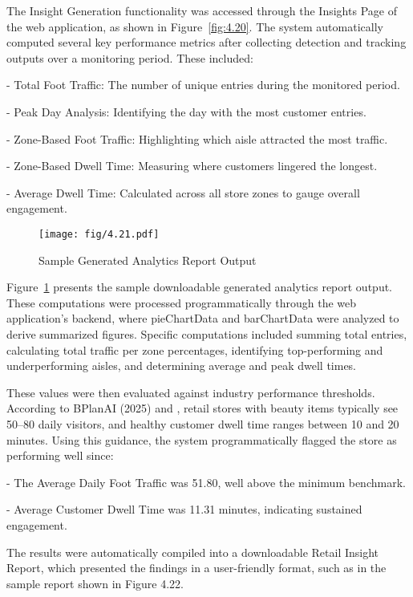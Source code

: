 {The Insight Generation functionality was accessed through the Insights Page of the web application, as shown in Figure~\ref{fig:4.20}. The system automatically computed several key performance metrics after collecting detection and tracking outputs over a monitoring period. These included:

\noindent - Total Foot Traffic: The number of unique entries during the monitored period.

\noindent - Peak Day Analysis: Identifying the day with the most customer entries.

\noindent - Zone-Based Foot Traffic: Highlighting which aisle attracted the most traffic.

\noindent - Zone-Based Dwell Time: Measuring where customers lingered the longest.

\noindent - Average Dwell Time: Calculated across all store zones to gauge overall engagement.

\begin{figure}[H]
	\caption[Sample Generated Analytics Report Output]{\newline \newline Sample Generated Analytics Report Output}
	\centering
	\texttt{[image: fig/4.21.pdf]}
	\label{fig:4.21}
\end{figure}

Figure~\ref{fig:4.21} presents the sample downloadable generated analytics report output. These computations were processed programmatically through the web application's backend, where pieChartData and barChartData were analyzed to derive summarized figures. Specific computations included summing total entries, calculating total traffic per zone percentages, identifying top-performing and underperforming aisles, and determining average and peak dwell times.

These values were then evaluated against industry performance thresholds. According to BPlanAI (2025) and \cite{CountTrack2025}, retail stores with beauty items typically see 50–80 daily visitors, and healthy customer dwell time ranges between 10 and 20 minutes. Using this guidance, the system programmatically flagged the store as performing well since:

\noindent - The Average Daily Foot Traffic was 51.80, well above the minimum benchmark.

\noindent - Average Customer Dwell Time was 11.31 minutes, indicating sustained engagement.

The results were automatically compiled into a downloadable Retail Insight Report, which presented the findings in a user-friendly format, such as in the sample report shown in Figure 4.22.

}
